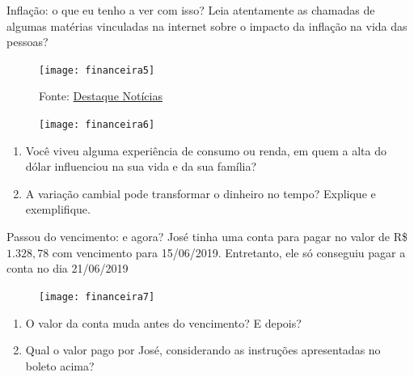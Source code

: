 \begin{task}{Inflação: o que eu tenho a ver com isso?}
Leia atentamente as chamadas de algumas matérias vinculadas na internet sobre o impacto da inflação na vida das pessoas?

\begin{figure}[H]
\centering

\texttt{[image: financeira5]}

\caption{Fonte: \href{https://www.destaquenoticias.com.br/panificadores-de-sergipe-prometem-reajustar-preco-do-pao/}{Destaque Notícias}}
\end{figure}

\begin{figure}[H]
\centering

\texttt{[image: financeira6]}
\end{figure}
\begin{enumerate}
  \item Você viveu alguma experiência de consumo ou renda, em quem a alta do dólar influenciou na sua vida e da sua família?
  \item A variação cambial pode transformar o dinheiro no tempo? Explique e exemplifique.
\end{enumerate}
\end{task}
\needspace{.1\textheight}
\begin{task}{Passou do vencimento: e agora?}
José tinha uma conta para pagar no valor de R\$ $1.328{,}78$ com vencimento para 15/06/2019. Entretanto, ele só conseguiu pagar a conta no dia 21/06/2019

\begin{figure}[H]
\centering

\texttt{[image: financeira7]}
\end{figure}

\begin{enumerate}
  \item O valor da conta muda antes do vencimento? E depois?
  \item Qual o valor pago por José, considerando as instruções apresentadas no boleto acima?
\end{enumerate}
\end{task}

